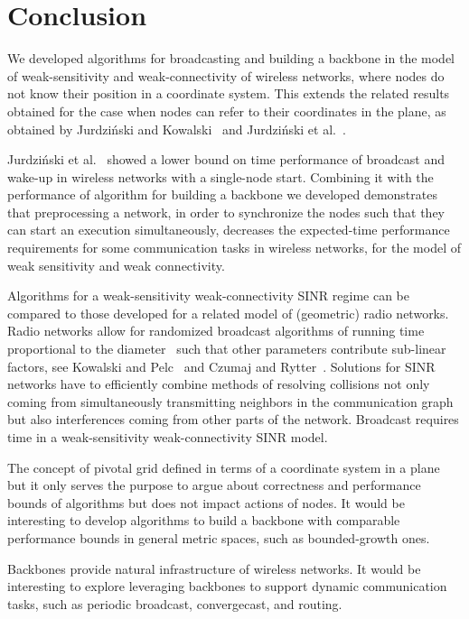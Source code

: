 \documentclass[11pt]{article}
\begin{document}
\section{Conclusion}




We developed algorithms for broadcasting and building a backbone in the model of weak-sensitivity and weak-connectivity of wireless networks, where nodes do not know their position in a coordinate system.
This extends the related results obtained for the case when nodes  can refer to their coordinates in the plane, as obtained by Jurdzi\'nski and Kowalski~\cite{JK-DISC12} and Jurdzi\'nski et al.~\cite{JKS-ICALP-13}.

Jurdzi\'nski et al.~\cite{JKS-ICALP-13} showed a lower bound  on time performance of broadcast and wake-up in wireless networks with a single-node start. 
Combining it with the performance of algorithm for building a backbone we developed demonstrates that preprocessing a network, in order to synchronize the nodes such that they can start an execution simultaneously, decreases the expected-time performance requirements for some communication tasks in  wireless networks, for the model of weak sensitivity and weak connectivity.

Algorithms for a weak-sensitivity weak-connectivity SINR regime can be compared to those developed for a related model of (geometric) radio networks.
Radio networks allow for randomized broadcast algorithms of running time proportional to the diameter~ such that other parameters contribute sub-linear factors, see Kowalski and Pelc~\cite{KowalskiP05} and Czumaj and Rytter~\cite{CzumajR06}.
Solutions for SINR networks have to efficiently combine methods of resolving collisions not only coming from simultaneously transmitting neighbors in the communication graph but also  interferences coming from other parts of the network. 
Broadcast requires time   in a weak-sensitivity weak-connectivity SINR model.

The concept of pivotal grid defined in terms of a coordinate system in a plane but it only serves the purpose to argue about correctness and performance bounds of algorithms but does not impact actions of nodes.
It would be interesting to develop algorithms to build a backbone with comparable performance bounds in general metric spaces, such as bounded-growth ones.

Backbones provide natural infrastructure of wireless networks.
It would be interesting to explore leveraging backbones to support dynamic communication  tasks, such as  periodic broadcast, convergecast, and routing.

\newpage



\end{document}
